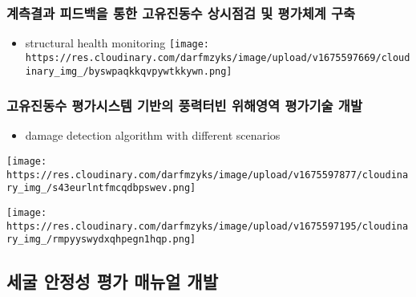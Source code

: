 \documentclass[
  letterpaper,
  DIV=11,
  numbers=noendperiod]{scrreprt}
\providecommand{\tightlist}{%
  \setlength{\itemsep}{0pt}\setlength{\parskip}{0pt}}\usepackage{longtable,booktabs,array}
\begin{document}
\hypertarget{uxacc4uxce21uxacb0uxacfc-uxd53cuxb4dcuxbc31uxc744-uxd1b5uxd55c-uxace0uxc720uxc9c4uxb3d9uxc218-uxc0c1uxc2dcuxc810uxac80-uxbc0f-uxd3c9uxac00uxccb4uxacc4-uxad6cuxcd95}{%
\subsubsection{계측결과 피드백을 통한 고유진동수 상시점검 및 평가체계
구축}\label{uxacc4uxce21uxacb0uxacfc-uxd53cuxb4dcuxbc31uxc744-uxd1b5uxd55c-uxace0uxc720uxc9c4uxb3d9uxc218-uxc0c1uxc2dcuxc810uxac80-uxbc0f-uxd3c9uxac00uxccb4uxacc4-uxad6cuxcd95}}

\begin{itemize}
\tightlist
\item
  structural health monitoring
  \texttt{[image: https://res.cloudinary.com/darfmzyks/image/upload/v1675597669/cloudinary\_img\_/byswpaqkkqvpywtkkywn.png]}
\end{itemize}

\hypertarget{uxace0uxc720uxc9c4uxb3d9uxc218-uxd3c9uxac00uxc2dcuxc2a4uxd15c-uxae30uxbc18uxc758-uxd48duxb825uxd130uxbe48-uxc704uxd574uxc601uxc5ed-uxd3c9uxac00uxae30uxc220-uxac1cuxbc1c}{%
\subsubsection{고유진동수 평가시스템 기반의 풍력터빈 위해영역 평가기술
개발}\label{uxace0uxc720uxc9c4uxb3d9uxc218-uxd3c9uxac00uxc2dcuxc2a4uxd15c-uxae30uxbc18uxc758-uxd48duxb825uxd130uxbe48-uxc704uxd574uxc601uxc5ed-uxd3c9uxac00uxae30uxc220-uxac1cuxbc1c}}

\begin{itemize}
\tightlist
\item
  damage detection algorithm with different scenarios
\end{itemize}

\texttt{[image: https://res.cloudinary.com/darfmzyks/image/upload/v1675597877/cloudinary\_img\_/s43eurlntfmcqdbpswev.png]}

\texttt{[image: https://res.cloudinary.com/darfmzyks/image/upload/v1675597195/cloudinary\_img\_/rmpyyswydxqhpegn1hqp.png]}

\hypertarget{uxc138uxad74-uxc548uxc815uxc131-uxd3c9uxac00-uxb9e4uxb274uxc5bc-uxac1cuxbc1c}{%
\subsection{세굴 안정성 평가 매뉴얼
개발}\label{uxc138uxad74-uxc548uxc815uxc131-uxd3c9uxac00-uxb9e4uxb274uxc5bc-uxac1cuxbc1c}}
\end{document}
